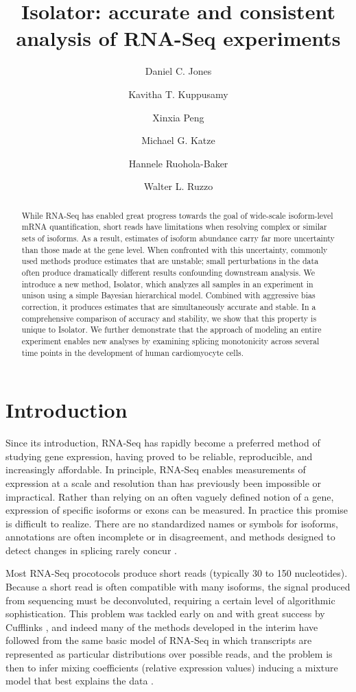 \documentclass[twocolumn]{article}
\title{Isolator: accurate and consistent analysis of RNA-Seq experiments}
\author{Daniel C. Jones \and Kavitha T. Kuppusamy \and Xinxia Peng \and Michael G. Katze \and Hannele Ruohola-Baker \and Walter L. Ruzzo}
\date{}
\begin{document}
\maketitle

\begin{abstract}
    While RNA-Seq has enabled great progress towards the goal of wide-scale
    isoform-level mRNA quantification, short reads have limitations when
    resolving complex or similar sets of isoforms. As a result, estimates of
    isoform abundance carry far more uncertainty than those made at the gene
    level. When confronted with this uncertainty, commonly used methods produce
    estimates that are unstable; small perturbations in the data often produce
    dramatically different results confounding downstream analysis. We introduce
    a new method, Isolator, which analyzes all samples in an experiment in
    unison using a simple Bayesian hierarchical model. Combined with aggressive
    bias correction, it produces estimates that are simultaneously accurate and
    stable. In a comprehensive comparison of accuracy and stability, we show
    that this property is unique to Isolator. We further demonstrate that the
    approach of modeling an entire experiment enables new analyses by examining
    splicing monotonicity across several time points in the development of human
    cardiomyocyte cells.
\end{abstract}


\section{Introduction}\label{introduction}

Since its introduction, RNA-Seq has rapidly become a preferred method of
studying gene expression, having proved to be reliable, reproducible, and
increasingly affordable. In principle, RNA-Seq enables measurements of
expression at a scale and resolution than has previously been impossible or
impractical. Rather than relying on an often vaguely defined notion of a gene,
expression of specific isoforms or exons can be measured. In practice this
promise is difficult to realize. There are no standardized names or symbols for
isoforms, annotations are often incomplete or in disagreement, and methods
designed to detect changes in splicing rarely concur \cite{Liu:2014dn}.

Most RNA-Seq procotocols produce short reads (typically 30 to 150 nucleotides).
Because a short read is often compatible with many isoforms, the signal produced
from sequencing must be deconvoluted, requiring a certain level of algorithmic
sophistication. This problem was tackled early on and with great success by
Cufflinks \cite{Trapnell:2010kd}, and indeed many of the methods developed in
the interim have followed from the same basic model of RNA-Seq in which
transcripts are represented as particular distributions over possible reads, and
the problem is then to infer mixing coefficients (relative expression values)
inducing a mixture model that best explains the data \cite{Pachter:2011wm}.
\end{document}
